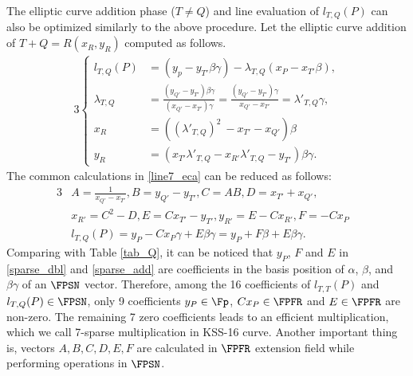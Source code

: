 The elliptic curve addition phase ($T\neq Q$) and line evaluation of $ l_{T,Q}(P)$ can also be optimized similarly to the above procedure.
Let the elliptic curve addition of $T+Q = R(x_R, y_R)$ computed as follows.
\begin{alignat}{3}
\begin{cases}\label{line7_eca}
l_{T,Q}(P)& = (y_p-y_{T'}\beta \gamma)- \lambda_{T,Q}(x_P-x_{T'}\beta),\\
\lambda_{T,Q} &= \frac{( y_{Q'}-y_{T'})\beta\gamma }{( x_{Q'}-x_{T'})\gamma} = \frac{( y_{Q'}-y_{T'}) \gamma}{x_{Q'}-x_{T'}} = \lambda'_{T,Q} \gamma, \\
x_{R} &= ((\lambda'_{T,Q})^2  \ - x_{T'} -x_{Q'})\beta  \\
y_{R} &= (x_{T'}\lambda'_{T,Q} -x_{R'}\lambda'_{T,Q}-y_{T'})\beta \gamma.
\end{cases}
\end{alignat}
The common calculations in \eqref{line7_eca} can be reduced as follows: 
\begin{alignat}{3}
&A=\frac{1}{x_{Q'}-x_{T'}}, B=y_{Q'}-y_{T'}, C=AB, D=x_{T'}+x_{Q'},&\nonumber\\
& x_{R'}=C^2-D, E= Cx_{T'}-y_{T'}, y_{R'}=E-Cx_{R'},  F=-Cx_P &\nonumber\\
&l_{T,Q}(P)= y_P-Cx_P\gamma +E \beta\gamma = y_P+F\beta+E\beta \gamma. &\label{sparse_add}
\end{alignat}
Comparing with Table \ref{tab_Q}, it can be noticed that $y_P$, $F$ and $E$ in \eqref{sparse_dbl} and \eqref{sparse_add} are coefficients in the basis position of $\alpha$, $\beta$, and $\beta\gamma$ of an $\FPSN$ vector.
Therefore,  among the 16 coefficients of  $l_{T,T}(P)$ and $l_{T,Q}(P)\in \FPSN$, only 9 coefficients $y_P\in \Fp$, $Cx_P\in \FPFR$ and $E\in \FPFR$ are  non-zero.
The remaining 7 zero coefficients leads to an efficient multiplication, which we call 7-sparse multiplication in KSS-16 curve. 
Another important thing is, vectors $A,B,C, D, E, F$  are calculated in $\FPFR$ extension field while performing operations in $\FPSN$.

